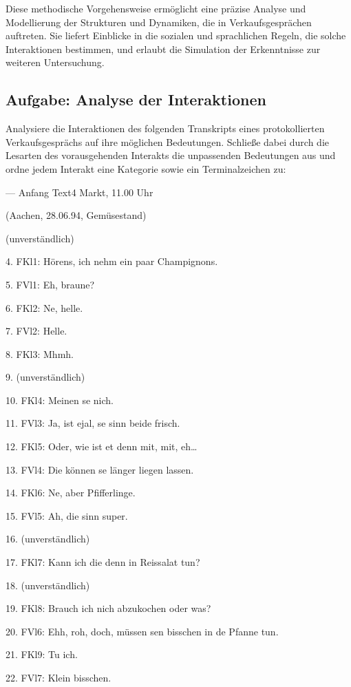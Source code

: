 \documentclass[
]{article}
\begin{document}
Diese methodische Vorgehensweise ermöglicht eine präzise Analyse und Modellierung der Strukturen und Dynamiken, die in Verkaufsgesprächen auftreten. Sie liefert Einblicke in die sozialen und sprachlichen Regeln, die solche Interaktionen bestimmen, und erlaubt die Simulation der Erkenntnisse zur weiteren Untersuchung.

\subsection{Aufgabe: Analyse der Interaktionen}\label{aufgabe-analyse-der-interaktionen}

Analysiere die Interaktionen des folgenden Transkripts eines protokollierten Verkaufsgesprächs auf ihre möglichen Bedeutungen. Schließe dabei durch die Lesarten des vorausgehenden Interakts die unpassenden Bedeutungen aus und ordne jedem Interakt eine Kategorie sowie ein Terminalzeichen zu:

--- Anfang Text4 Markt, 11.00 Uhr

(Aachen, 28.06.94, Gemüsestand)

(unverständlich)

4. FKl1: Hörens, ich nehm ein paar Champignons.

5. FVl1: Eh, braune?

6. FKl2: Ne, helle.

7. FVl2: Helle.

8. FKl3: Mhmh.

9. (unverständlich)

10. FKl4: Meinen se nich.

11. FVl3: Ja, ist ejal, se sinn beide frisch.

12. FKl5: Oder, wie ist et denn mit, mit, eh\ldots

13. FVl4: Die können se länger liegen lassen.

14. FKl6: Ne, aber Pfifferlinge.

15. FVl5: Ah, die sinn super.

16. (unverständlich)

17. FKl7: Kann ich die denn in Reissalat tun?

18. (unverständlich)

19. FKl8: Brauch ich nich abzukochen oder was?

20. FVl6: Ehh, roh, doch, müssen se\textquotesingle n bisschen in de Pfanne tun.

21. FKl9: Tu ich.

22. FVl7: Klein bisschen.
\end{document}

